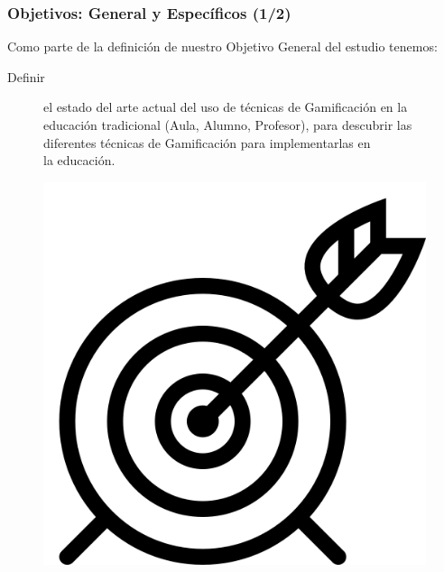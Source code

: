 \documentclass{beamer}
\begin{document}
\begin{frame}
    \frametitle{Objetivos: General y Específicos (1/2)}
    Como parte de la definición de nuestro Objetivo General del estudio tenemos:
    \begin{description}
	    \item[Definir] el estado del arte actual del uso de técnicas de Gamificación en la educación tradicional (Aula, Alumno, Profesor), para descubrir las diferentes técnicas de Gamificación para implementarlas en\\ la educación.
    \end{description}
	\begin{figure}
		\begin{center}
			\includegraphics[scale=0.1]{images/2icons/tarjet.png}
			\label{student}
		\end{center}
	\end{figure}
\end{frame}
\end{document}
